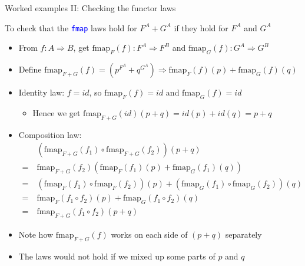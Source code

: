 \documentclass[english]{beamer}
\begin{document}
\begin{frame}{Worked examples II: Checking the functor laws}

To check that the \texttt{\textcolor{blue}{\footnotesize{}fmap}} laws
hold for $F^{A}+G^{A}$ if they hold for $F^{A}$ and $G^{A}$
\begin{itemize}
\item From $f:A\Rightarrow B$, get $\text{fmap}_{F}(f):F^{A}\Rightarrow F^{B}$
and $\text{fmap}_{G}(f):G^{A}\Rightarrow G^{B}$
\item Define $\text{fmap}_{F+G}(f)=(p^{F^{A}}+q^{G^{A}})\Rightarrow\text{fmap}_{F}(f)(p)+\text{fmap}_{G}(f)(q)$
\item Identity law: $f=id$, so $\text{fmap}_{F}(f)=id$ and $\text{fmap}_{G}(f)=id$
\begin{itemize}
\item Hence we get $\text{fmap}_{F+G}(id)(p+q)=id(p)+id(q)=p+q$
\end{itemize}
\item Composition law: 
\begin{align*}
 & (\text{fmap}_{F+G}(f_{1})\circ\text{fmap}_{F+G}(f_{2}))(p+q)\\
=\  & \text{fmap}_{F+G}(f_{2})\left(\text{fmap}_{F}(f_{1})(p)+\text{fmap}_{G}(f_{1})(q)\right)\\
=\  & (\text{fmap}_{F}(f_{1})\circ\text{fmap}_{F}(f_{2}))(p)+\left(\text{fmap}_{G}(f_{1})\circ\text{fmap}_{G}(f_{2})\right)(q)\\
=\  & \text{fmap}_{F}(f_{1}\circ f_{2})(p)+\text{fmap}_{G}(f_{1}\circ f_{2})(q)\\
=\  & \text{fmap}_{F+G}(f_{1}\circ f_{2})(p+q)
\end{align*}
\item Note how $\text{fmap}_{F+G}(f)$ works on each side of $\left(p+q\right)$
separately
\item The laws would not hold if we mixed up some parts of $p$ and $q$
\end{itemize}
\end{frame}
\end{document}
